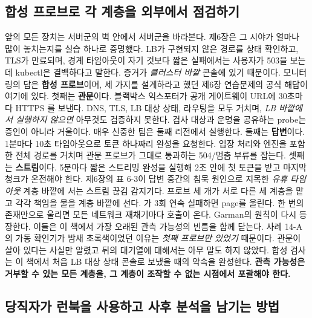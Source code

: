 \subsection*{합성 프로브로 각 계층을 외부에서 점검하기}

앞의 모든 장치는 서버군의 벽 안에서 서버군을 바라본다. 제6장은 그 시야가 얼마나 많이 놓치는지를 실습 하나로 증명했다. LB가 구현되지 않은 경로를 상태 확인하고, TLS가 만료되며, 경계 타임아웃이 자기 것보다 짧은 실패에서는 사용자가 503을 보는데 kubectl은 결백하다고 말한다. 증거가 \textit{클러스터 바깥} 콘솔에 있기 때문이다. 모니터링의 답은 \textbf{합성 프로브}이며, 세 가지를 설계하라고 했던 제6장 연습문제의 공식 해답이 여기에 있다. 첫째는 \textbf{관문}이다. 블랙박스 익스포터가 공개 게이트웨이 URL에 30초마다 HTTPS 를 보낸다. DNS, TLS, LB 대상 상태, 라우팅을 모두 거치며, \textit{LB 바깥에서 실행하지 않으면} 아무것도 검증하지 못한다. 검사 대상과 운명을 공유하는 probe는 증인이 아니라 거울이다. 매우 신중한 팀은 둘째 리전에서 실행한다. 둘째는 \textbf{답변}이다. 1분마다 10초 타임아웃으로 토큰 하나짜리 완성을 요청한다. 입장 처리와 엔진을 포함한 전체 경로를 거치며 관문 프로브가 그대로 통과하는 504/멈춤 부류를 잡는다. 셋째는 \textbf{스트림}이다. 5분마다 짧은 스트리밍 완성을 실행해 2초 안에 첫 토큰을 받고 마지막 청크가 온전해야 한다. 제6장의 표 6-3이 답변 중간의 침묵 원인으로 지목한 \textit{유휴 타임아웃} 계층 바깥에 서는 스트림 끊김 감지기다. 프로브 세 개가 서로 다른 세 계층을 맡고 각각 책임을 물을 계층 바깥에 선다. 가 3회 연속 실패하면 page를 울린다. 한 번의 존재만으로 울리면 모든 네트워크 재채기마다 호출이 온다. Garman의 원칙이 다시 등장한다. 이들은 이 책에서 가장 오래된 관측 가능성의 빈틈을 함께 닫는다. 사례 14-A의 가동 확인기가 밤새 초록색이었던 이유는 \textit{첫째 프로브만 있었기} 때문이다. 관문이 살아 있다는 사실만 알렸고 뒤의 대기열에 대해서는 아무 말도 하지 않았다. 합성 검사는 이 책에서 처음 LB 대상 상태 콘솔로 보냈을 때의 약속을 완성한다. \textbf{관측 가능성은 거부할 수 있는 모든 계층을, 그 계층이 조작할 수 없는 시점에서 포괄해야 한다.}

\subsection*{당직자가 런북을 사용하고 사후 분석을 남기는 방법}

